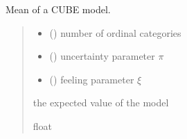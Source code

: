 \documentclass[letterpaper,10pt,english]{sphinxmanual}
\begin{document}

\begin{fulllineitems}
\label{\detokenize{cubmods:cubmods.cube.mean}}
\pysigstartsignatures
{}
\pysigstopsignatures
\sphinxAtStartPar
Mean of a CUBE model.
\begin{quote}\begin{description}
\begin{itemize}
\item {} 
\sphinxAtStartPar
{} () \textendash{} number of ordinal categories

\item {} 
\sphinxAtStartPar
{} () \textendash{} uncertainty parameter \(\pi\)

\item {} 
\sphinxAtStartPar
{} () \textendash{} feeling parameter \(\xi\)

\end{itemize}

\sphinxAtStartPar
the expected value of the model

\sphinxAtStartPar
float

\end{description}\end{quote}

\end{fulllineitems}

\end{document}
